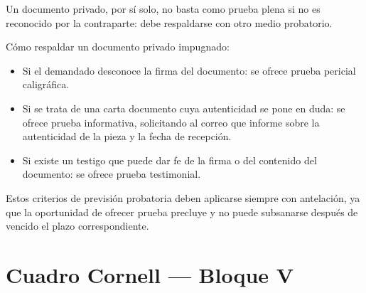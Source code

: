 \documentclass[12pt,oneside]{book}
\begin{document}
Un documento privado, por sí solo, no basta como prueba plena si no es reconocido por la contraparte: debe respaldarse con otro medio probatorio.

\begin{important}
Cómo respaldar un documento privado impugnado:
\begin{itemize}
    \item Si el demandado desconoce la firma del documento: se ofrece prueba pericial caligráfica.
    \item Si se trata de una carta documento cuya autenticidad se pone en duda: se ofrece prueba informativa, solicitando al correo que informe sobre la autenticidad de la pieza y la fecha de recepción.
    \item Si existe un testigo que puede dar fe de la firma o del contenido del documento: se ofrece prueba testimonial.
\end{itemize}
\end{important}

Estos criterios de previsión probatoria deben aplicarse siempre con antelación, ya que la oportunidad de ofrecer prueba precluye y no puede subsanarse después de vencido el plazo correspondiente.

\section*{Cuadro Cornell — Bloque V}
\end{document}
